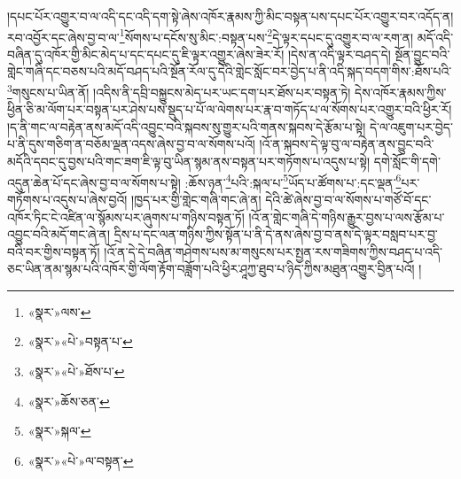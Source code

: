 །དཔང་པོར་འགྱུར་བ་ལ་འདི་དང་འདི་དག་སྟེ་ཞེས་འཁོར་རྣམས་ཀྱི་མིང་བསྟན་པས་དཔང་པོར་འགྱུར་བར་འདོད་ན། རབ་འབྱོར་དང་ཞེས་བྱ་བ་ལ་\footnote{«སྣར་»ལས་}སོགས་པ་དངོས་སུ་མིང་:བསྟན་པས་\footnote{«སྣར་»«པེ་»བསྟན་པ་}དེ་ལྟར་དཔང་དུ་འགྱུར་བ་ལ་རག་ན། མདོ་འདི་བཞིན་དུ་འཁོར་གྱི་མིང་མེད་པ་དང་དཔང་དུ་ཇི་ལྟར་འགྱུར་ཞེས་ཟེར་རོ། །དེས་ན་འདི་ལྟར་བཤད་དེ། སྔོན་བྱུང་བའི་གླེང་གཞི་དང་བཅས་པའི་མདོ་བཤད་པའི་སྔོན་རོལ་དུ་དེའི་གླེང་སློང་བར་བྱེད་པ་ནི་འདི་སྐད་བདག་གིས་:ཐོས་པའི་\footnote{«སྣར་»«པེ་»ཐོས་པ་}གསུངས་པ་ཡིན་ནོ། །འདིས་ནི་དབྲི་བསྐྱུངས་མེད་པར་ཡང་དག་པར་ཐོས་པར་བསྟན་ཏེ། དེས་འཁོར་རྣམས་ཀྱིས་ཕྱིན་ཅི་མ་ལོག་པར་བསྟན་པར་ཤེས་པས་སྡུད་པ་པོ་ལ་ལེགས་པར་རྣ་བ་གཏོད་པ་ལ་སོགས་པར་འགྱུར་བའི་ཕྱིར་རོ། །ད་ནི་གང་ལ་བརྟེན་ནས་མདོ་འདི་འབྱུང་བའི་སྐབས་སུ་གྱུར་པའི་གནས་སྐབས་དེ་རྩོམ་པ་སྟེ། དེ་ལ་འཇུག་པར་བྱེད་པ་ནི་དུས་གཅིག་ན་བཅོམ་ལྡན་འདས་ཞེས་བྱ་བ་ལ་སོགས་པའོ། །འོ་ན་སྐབས་དེ་ལྟ་བུ་ལ་བརྟེན་ནས་བྱུང་བའི་མདོའི་དབང་དུ་བྱས་པའི་གང་ཟག་ཇི་ལྟ་བུ་ཡིན་སྙམ་ནས་བསྟན་པར་གཏོགས་པ་འདུས་པ་སྟེ། དགེ་སློང་གི་དགེ་འདུན་ཆེན་པོ་དང་ཞེས་བྱ་བ་ལ་སོགས་པ་སྟེ། :ཆོས་ཉན་\footnote{«སྣར་»ཆོས་ཅན་}པའི་:སྐལ་པ་\footnote{«སྣར་»སྐལ་}ཡོད་པ་ཚོགས་པ་:དང་ལྡན་\footnote{«སྣར་»«པེ་»ལ་བསྟན་}པར་གཏོགས་པ་འདུས་པ་ཞེས་བྱའོ། །ཁྱད་པར་གྱི་གླེང་གཞི་གང་ཞེ་ན། དེའི་ཚེ་ཞེས་བྱ་བ་ལ་སོགས་པ་གཙོ་བོ་དང་འཁོར་ཏིང་ངེ་འཛིན་ལ་སྙོམས་པར་ཞུགས་པ་གཉིས་བསྟན་ཏོ། །འོ་ན་གླེང་གཞི་དེ་གཉིས་རྒྱུར་བྱས་པ་ལས་རྩོམ་པ་འབྱུང་བའི་མདོ་གང་ཞེ་ན། དྲིས་པ་དང་ལན་གཉིས་ཀྱིས་སྟོན་པ་ནི་དེ་ནས་ཞེས་བྱ་བ་ནས་དེ་ལྟར་བསླབ་པར་བྱ་བའི་བར་གྱིས་བསྟན་ཏོ། །འོ་ན་དེ་དེ་བཞིན་གཤེགས་པས་མ་གསུངས་པར་སྤྱན་རས་གཟིགས་ཀྱིས་བཤད་པ་འདི་ཅང་ཡིན་ནམ་སྙམ་པའི་འཁོར་གྱི་ལོག་རྟོག་བཟློག་པའི་ཕྱིར་ཤཱཀྱ་ཐུབ་པ་ཉིད་ཀྱིས་མཐུན་འགྱུར་བྱིན་པའོ། །
